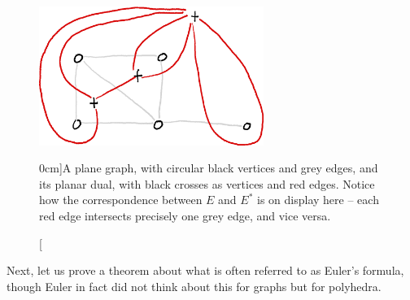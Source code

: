 \documentclass[nobib]{tufte-handout}
\begin{document}
\begin{figure}
  \centering
  \includegraphics[width=0.65\textwidth]{graphics/L11_planarity/planar_dual.png}
  \caption[][0cm]{A plane graph, with circular black vertices and grey edges, and its planar dual, with black crosses as vertices and red edges. Notice how the correspondence between $E$ and $E^*$ is on display here -- each red edge intersects precisely one grey edge, and vice versa.}
  \label{fig:planar_dual}
\end{figure}

Next, let us prove a theorem about what is often referred to as Euler's formula, though Euler in fact did not think about this for graphs but for polyhedra.
\end{document}

